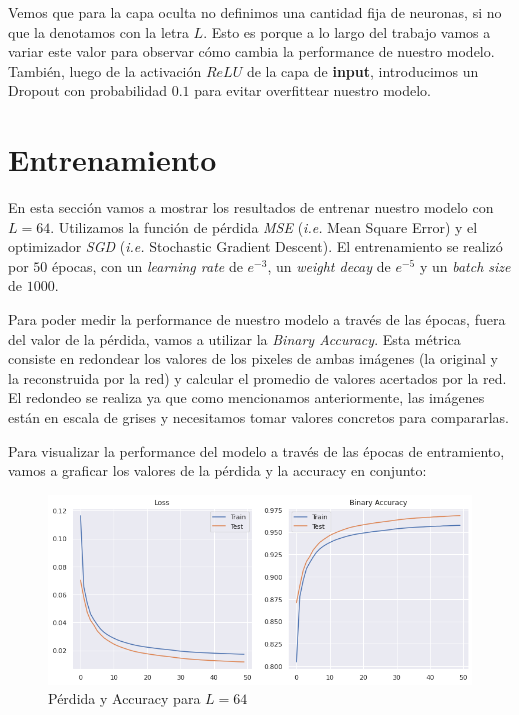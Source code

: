 \documentclass [a4paper,12pt,oneside,final]{article}
\begin{document}
Vemos que para la capa oculta no definimos una cantidad fija de neuronas, si no que la denotamos con la letra $L$. Esto es porque a lo largo del trabajo vamos a variar este valor para observar cómo cambia la performance de nuestro modelo. También, luego de la activación $ReLU$ de la capa de {\bf input}, introducimos un Dropout con probabilidad $0.1$ para evitar overfittear nuestro modelo.

\section{Entrenamiento}

En esta sección vamos a mostrar los resultados de entrenar nuestro modelo con $L = 64$. Utilizamos la función de pérdida {\it MSE} ({\it i.e.} Mean Square Error) y el optimizador {\it SGD} ({\it i.e.} Stochastic Gradient Descent). El entrenamiento se realizó por $50$ épocas, con un {\it learning rate} de $e^{-3}$, un {\it weight decay} de $e^{-5}$ y un {\it batch size} de $1000$.

Para poder medir la performance de nuestro modelo a través de las épocas, fuera del valor de la pérdida, vamos a utilizar la {\it Binary Accuracy}. Esta métrica consiste en redondear los valores de los pixeles de ambas imágenes (la original y la reconstruida por la red) y calcular el promedio de valores acertados por la red. El redondeo se realiza ya que como mencionamos anteriormente, las imágenes están en escala de grises y necesitamos tomar valores concretos para compararlas.

Para visualizar la performance del modelo a través de las épocas de entramiento, vamos a graficar los valores de la pérdida y la accuracy en conjunto:

\begin{figure}[ht]
  \centering
  \includegraphics[width=15cm,keepaspectratio]{./graficos/training_metrics.png}
  \caption{Pérdida y Accuracy para $L=64$}\label{training_metrics}
\end{figure}
\end{document}
